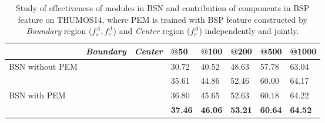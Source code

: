 \documentclass[runningheads]{llncs}
\begin{document}
\begin{table}[tbp]
\setlength{\abovecaptionskip}{0.1cm} %
\small
\centering
\caption{ Study of effectiveness of modules in BSN and  contribution of components in BSP feature on THUMOS14, where PEM is trained with BSP feature constructed by   \emph{Boundary} region ($f_s^A,f_e^A$) and   \emph{Center} region ($f_c^A$) independently and jointly.}
\begin{tabular}{p{2.7cm}p{1.3cm}<{\centering}p{1.3cm}<{\centering}p{1.2cm}<{\centering}p{1.2cm}<{\centering} p{1.2cm}<{\centering}p{1.2cm}<{\centering}p{1.2cm}<{\centering}}
\toprule
					& \emph{Boundary} 	& \emph{Center} 	& @50	& @100 	& @200	& @500	& @1000 \\
 \hline
 BSN without PEM 	&			&			& 30.72	& 40.52 	& 48.63	& 57.78	& 63.04\\
 \hline
 					&\Checkmark 	& 			& 35.61	& 44.86	& 52.46	& 60.00	& 64.17\\
 BSN with PEM 		&  			&\Checkmark	& 36.80	& 45.65	& 52.63	& 60.18	& 64.22\\
 					&\Checkmark	&\Checkmark	& {\bf 37.46}	& {\bf 46.06	}& {\bf 53.21}	& {\bf 60.64}	& {\bf 64.52}\\
\bottomrule
\end{tabular}
\label{table_post}
\vspace{-0.6cm}
\end{table}
\end{document}

